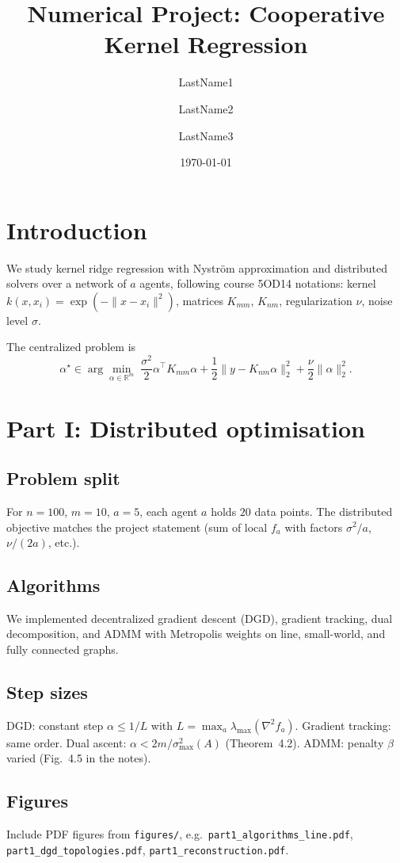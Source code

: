 \documentclass[11pt,a4paper]{article}
\title{Numerical Project: Cooperative Kernel Regression}
\author{LastName1 \and LastName2 \and LastName3}
\date{\today}
\begin{document}
\maketitle

\section{Introduction}
We study kernel ridge regression with Nystr\"om approximation and distributed solvers over a network of $a$ agents, following course 5OD14 notations: kernel $k(x,x_i)=\exp(-\|x-x_i\|^2)$, matrices $K_{mm}$, $K_{nm}$, regularization $\nu$, noise level $\sigma$.

The centralized problem is
\begin{equation}
\alpha^\star \in \arg\min_{\alpha\in\mathbb{R}^m}\;
\frac{\sigma^2}{2}\alpha^\top K_{mm}\alpha + \frac{1}{2}\|y-K_{nm}\alpha\|_2^2 + \frac{\nu}{2}\|\alpha\|_2^2 .
\end{equation}

\section{Part I: Distributed optimisation}
\subsection{Problem split}
For $n=100$, $m=10$, $a=5$, each agent $a$ holds $20$ data points. The distributed objective matches the project statement (sum of local $f_a$ with factors $\sigma^2/a$, $\nu/(2a)$, etc.).

\subsection{Algorithms}
We implemented decentralized gradient descent (DGD), gradient tracking, dual decomposition, and ADMM with Metropolis weights on line, small-world, and fully connected graphs.

\subsection{Step sizes}
DGD: constant step $\alpha \le 1/L$ with $L=\max_a \lambda_{\max}(\nabla^2 f_a)$. Gradient tracking: same order. Dual ascent: $\alpha < 2m/\sigma_{\max}^2(A)$ (Theorem~4.2). ADMM: penalty $\beta$ varied (Fig.~4.5 in the notes).

\subsection{Figures}
Include PDF figures from \texttt{figures/}, e.g.\ \texttt{part1\_algorithms\_line.pdf}, \texttt{part1\_dgd\_topologies.pdf}, \texttt{part1\_reconstruction.pdf}.
\end{document}
